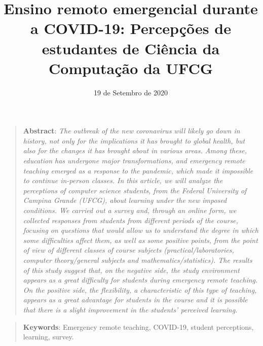 \documentclass[
  12pt,
  portuguese,
]{article}
\title{Ensino remoto emergencial durante a COVID-19: Percepções de
estudantes de Ciência da Computação da UFCG}
\author{}
\date{\vspace{-2.5em}19 de Setembro de 2020}
\begin{document}
\maketitle

\begin{quote}
\textbf{Abstract}: \emph{The outbreak of the new coronavirus will likely
go down in history, not only for the implications it has brought to
global health, but also for the changes it has brought about in various
areas. Among these, education has undergone major transformations, and
emergency remote teaching emerged as a response to the pandemic, which
made it impossible to continue in-person classes. In this article, we
will analyze the perceptions of computer science students, from the
Federal University of Campina Grande (UFCG), about learning under the
new imposed conditions. We carried out a survey and, through an online
form, we collected responses from students from different periods of the
course, focusing on questions that would allow us to understand the
degree in which some difficulties affect them, as well as some positive
points, from the point of view of different classes of course subjects
(practical/laboratories, computer theory/general subjects and
mathematics/statistics). The results of this study suggest that, on the
negative side, the study environment appears as a great difficulty for
students during emergency remote teaching. On the positive side, the
flexibility, a characteristic of this type of teaching, appears as a
great advantage for students in the course and it is possible that there
is a slight improvement in the students' perceived learning.}
\end{quote}

\begin{quote}
\textbf{Keywords}: Emergency remote teaching, COVID-19, student
perceptions, learning, survey.
\end{quote}

\newpage
\end{document}
